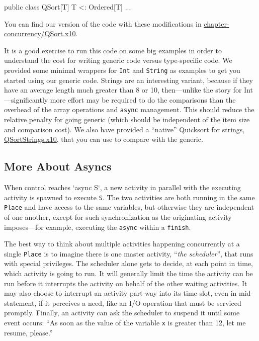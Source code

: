 \begin{finepoint}
\begin{xten}
public class QSort[T]{ T <: Ordered[T] }  { ... }
\end{xten}

You can find our version of the code with these modifications in 
\href{chapter-concurrency/QSort.x10}{chapter-concur\-ren\-cy/QSort.x10}.

It is a good exercise to run this code on some big examples in order to
understand the cost for writing  generic code versus type-specific code.
We provided some minimal wrappers
for {\tt Int} and {\tt String} as examples to get you started using our generic code. 
Strings are an interesting variant, because if they have an average length much
greater than 8 or 10, then---unlike the story for Int---significantly more effort may be
required to do the comparisons than the
overhead of the array operations and {\tt async} management.  This should reduce
the relative penalty for going generic (which should be independent of the item
size and comparison cost).   We also 
have provided a ``native'' Quicksort for strings, 
\href{chapter-concurrency/QSortStrings.x10}{QSortStrings.x10},
that you can use to compare with the generic.
\end{finepoint}

\subsection{More About Asyncs}\label{ssec:moreasyncs}

When control reaches \xcd`async S`, a new
activity in parallel with the executing activity is spawned to execute {\tt S}.
The two activities are both running in the same {\tt Place}  and have access
to the same variables, but otherwise they are
independent of one another, except for such synchronization as the originating
activity imposes---for example, executing the {\tt async} within a {\tt finish}.

The best way to think about multiple activities happening concurrently at a
single {\tt Place} is to imagine there is one master activity, ``{\em the scheduler}'', 
that runs with special privileges.  The
scheduler alone gets to decide, at each point in time, which activity is going to run.
It will generally limit the time the activity can be run before it interrupts
the activity on behalf of the other waiting activities.  It may also choose to interrupt an
activity part-way into its time slot, even in mid-statement, if it perceives a need, like
an I/O operation that must be serviced promptly.  Finally, an activity can ask the
scheduler to suspend it until some event occurs: ``As soon as the value of
the variable {\tt x} is greater than 12, let me resume, please.'' 

